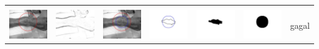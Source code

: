 \begin{table}[H]
\begin{tabular}{|m{0.7in}|m{0.7in}|m{0.7in}|m{0.7in}|m{0.7in}|m{0.7in}|m{0.7in}|}
		&  &  & & & &  \\
		\includegraphics[width=0.7in]{dataset/dataset_3/luka_merah/ready/6_integer_init.jpg}&
		\includegraphics[width=0.7in]{dataset/dataset_3/luka_merah/ready/6_integer_ext.jpg}&
		\includegraphics[width=0.7in]{dataset/dataset_3/luka_merah/ready/6_integer_result.jpg}&
		\includegraphics[width=0.7in]{dataset/dataset_3/luka_merah/ready/6_gt_r_integer.jpg}&
		\includegraphics[width=0.7in]{dataset/dataset_3/luka_merah/ready/6_r.jpg}&
		\includegraphics[width=0.7in]{dataset/dataset_3/luka_merah/ready/6_integer_r.jpg}&
		gagal\\
		\hline
		
	\end{tabular}
\end{table}

